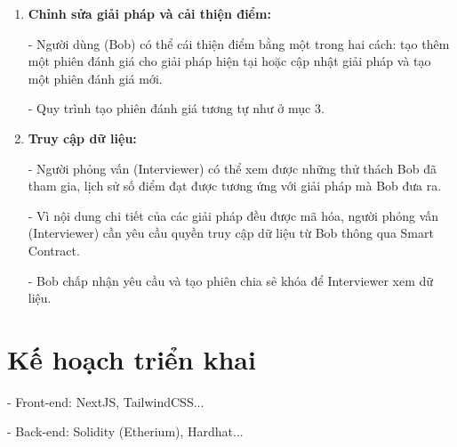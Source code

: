 \documentclass[a4paper, 12pt]{article}	 %
\begin{document}
\begin{enumerate}[label=\textbf{\Roman*.}]
\begin{enumerate}[label=\textbf{\arabic*.}]
    - Reviewer có thể yêu cầu tham gia vào phiên đánh giá. Sau khi hoàn thành đánh giá, mỗi Reviewer sẽ nộp điểm số kèm theo một khoản token đặt cược. \par
    - Smart Contract thu thập tất cả điểm số từ Reviewer, áp dụng thuật toán tính điểm để xác định số điểm cuối cùng. \par
    - Những Reviewer có điểm số gần với kết quả chính xác nhất sẽ nhận thêm token. Số lượng token đặt cược ban đầu càng lớn thì sẽ nhận lại càng nhiều. Những reviewer có điểm số càng lệch xa với kết quả sẽ bị phạt càng nhiều token dựa trên số token ban đầu đã đặt cược. \par  
    - Smart Contract sau đó cập nhật kết quả lên Blockchain để đảm bảo tính minh bạch và không thể chỉnh sửa. \par
    \item \textbf{Chỉnh sửa giải pháp và cải thiện điểm:} \par
    - Người dùng (Bob) có thể cái thiện điểm bằng một trong hai cách: tạo thêm một phiên đánh giá cho giải pháp hiện tại hoặc cập nhật giải pháp và tạo một phiên đánh giá mới. \par
    - Quy trình tạo phiên đánh giá tương tự như ở mục 3.
    \item \textbf{Truy cập dữ liệu:} \par
    - Người phỏng vấn (Interviewer) có thể xem được những thử thách Bob đã tham gia, lịch sử số điểm đạt được tương ứng với giải pháp mà Bob đưa ra. \par
    - Vì nội dung chi tiết của các giải pháp đều được mã hóa, người phỏng vấn (Interviewer) cần yêu cầu quyền truy cập dữ liệu từ Bob thông qua Smart Contract. \par
    - Bob chấp nhận yêu cầu và tạo phiên chia sẻ khóa để Interviewer xem dữ liệu.
  \end{enumerate}
\end{enumerate}


\section*{Kế hoạch triển khai}
- Front-end: NextJS, TailwindCSS...
\vspace{4pt}

- Back-end: Solidity (Etherium), Hardhat...
\vspace{4pt}
\end{document}
